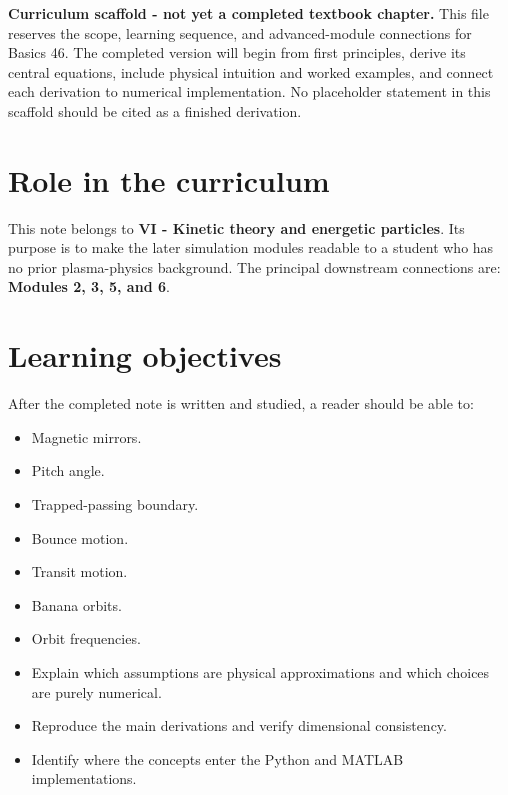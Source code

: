 \documentclass[11pt]{article}
\begin{document}

\begin{overviewbox}
\textbf{Curriculum scaffold - not yet a completed textbook chapter.} This file reserves the scope, learning sequence, and advanced-module connections for Basics 46. The completed version will begin from first principles, derive its central equations, include physical intuition and worked examples, and connect each derivation to numerical implementation. No placeholder statement in this scaffold should be cited as a finished derivation.
\end{overviewbox}

\ProjectTOC

\section{Role in the curriculum}
This note belongs to \textbf{VI - Kinetic theory and energetic particles}. Its purpose is to make the later simulation modules readable to a student who has no prior plasma-physics background. The principal downstream connections are: \textbf{Modules 2, 3, 5, and 6}.

\section{Learning objectives}
After the completed note is written and studied, a reader should be able to:
\begin{itemize}[leftmargin=1.6em]
\item Magnetic mirrors.
\item Pitch angle.
\item Trapped-passing boundary.
\item Bounce motion.
\item Transit motion.
\item Banana orbits.
\item Orbit frequencies.
\item Explain which assumptions are physical approximations and which choices are purely numerical.
\item Reproduce the main derivations and verify dimensional consistency.
\item Identify where the concepts enter the Python and MATLAB implementations.
\end{itemize}
\end{document}
